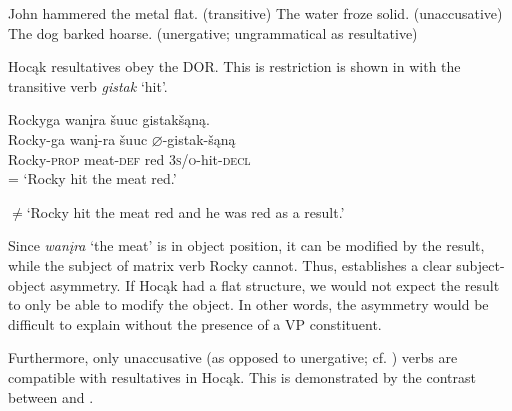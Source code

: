 \documentclass[output=paper]{LSP/langsci}
\begin{document}
\begin{exe}
\ex\label{ex:jrs:46}
\begin{xlist}
\ex John hammered the metal flat.	(transitive)
\ex The water froze solid.						(unaccusative)
\ex *The dog barked hoarse.	(unergative; ungrammatical as resultative)
\end{xlist}
\end{exe}
	
Hocąk resultatives obey the DOR. This is restriction is shown in  with the transitive verb \textit{gistak} `hit'.

\begin{exe}
\ex\label{ex:jrs:47} 
\glll Rockyga			wan\k{i}ra			\v{s}uuc 		gistak\v{s}ąną.\\
Rocky-ga		wan\k{i}-ra		\v{s}uuc		$\varnothing$-gistak-\v{s}ąną \\
Rocky-\textsc{prop}	meat-\textsc{def}	red			\textsc{3s/o}-hit-\textsc{decl} \\
\trans = `Rocky hit the meat red.'

$\neq$`Rocky hit the meat red and he was red as a result.'
\end{exe}

Since \textit{wan\k{i}ra} `the meat' is in object position, it can be modified by the result, while the subject of matrix verb Rocky cannot. Thus,  establishes a clear subject-object asymmetry. If Hocąk had a flat structure, we would not expect the result to only be able to modify the object. In other words, the asymmetry would be difficult to explain without the presence of a VP constituent.
	
Furthermore, only unaccusative (as opposed to unergative; cf. \citealt{Perlmutter1978}) verbs are compatible with resultatives in Hocąk. This is demonstrated by the contrast between  and .
\end{document}
